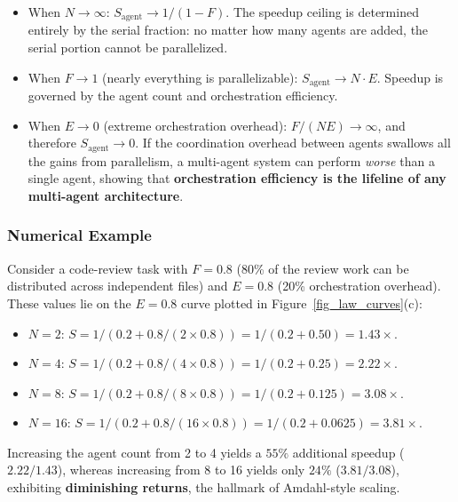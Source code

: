 \begin{itemize}[nosep]
\item When $N \to \infty$: $S_{\mathrm{agent}} \to 1/(1-F)$. The speedup ceiling is determined entirely by the serial fraction: no matter how many agents are added, the serial portion cannot be parallelized.

\item When $F \to 1$ (nearly everything is parallelizable): $S_{\mathrm{agent}} \to N \cdot E$. Speedup is governed by the agent count and orchestration efficiency.

\item When $E \to 0$ (extreme orchestration overhead): $F/(NE) \to \infty$, and therefore $S_{\mathrm{agent}} \to 0$. If the coordination overhead between agents swallows all the gains from parallelism, a multi-agent system can perform \emph{worse} than a single agent, showing that \textbf{orchestration efficiency is the lifeline of any multi-agent architecture}.
\end{itemize}

\subsubsection{Numerical Example}

Consider a code-review task with $F = 0.8$ (80\% of the review work can be distributed across independent files) and $E = 0.8$ (20\% orchestration overhead). These values lie on the $E=0.8$ curve plotted in Figure~\ref{fig_law_curves}(c):

\begin{itemize}[nosep]
\item $N = 2$: $S = 1/(0.2 + 0.8/(2 \times 0.8)) = 1/(0.2 + 0.50) = 1.43\times$.
\item $N = 4$: $S = 1/(0.2 + 0.8/(4 \times 0.8)) = 1/(0.2 + 0.25) = 2.22\times$.
\item $N = 8$: $S = 1/(0.2 + 0.8/(8 \times 0.8)) = 1/(0.2 + 0.125) = 3.08\times$.
\item $N = 16$: $S = 1/(0.2 + 0.8/(16 \times 0.8)) = 1/(0.2 + 0.0625) = 3.81\times$.
\end{itemize}

Increasing the agent count from 2 to 4 yields a $55\%$ additional speedup ($2.22/1.43$), whereas increasing from 8 to 16 yields only $24\%$ ($3.81/3.08$), exhibiting \textbf{diminishing returns}, the hallmark of Amdahl-style scaling.

